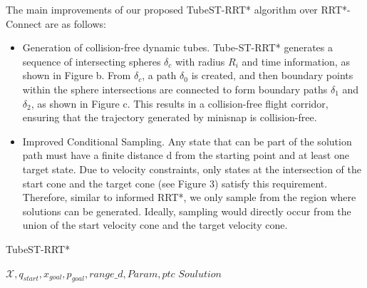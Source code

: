 \documentclass[conference]{IEEEtran}
\begin{document}
    The main improvements of our proposed TubeST-RRT* algorithm over RRT*-Connect are as follows:
    \begin{itemize}
        \item Generation of collision-free dynamic tubes. Tube-ST-RRT* generates a sequence of intersecting spheres $\delta_{c}$ with radius $R_i$ and time information, as shown in Figure b. From $\delta_{c}$, a path $\delta_{0}$ is created, and then boundary points within the sphere intersections are connected to form boundary paths $\delta_{1}$ and $\delta_{2}$, as shown in Figure c. This results in a collision-free flight corridor, ensuring that the trajectory generated by minisnap is collision-free.
        \item Improved Conditional Sampling. Any state that can be part of the solution path must have a finite distance d from the starting point and at least one target state. Due to velocity constraints, only states at the intersection of the start cone and the target cone (see Figure 3) satisfy this requirement. Therefore, similar to informed RRT*, we only sample from the region where solutions can be generated. Ideally, sampling would directly occur from the union of the start velocity cone and the target velocity cone. 
    \end{itemize}
    
    \begin{algorithm}
        \renewcommand{\algorithmicrequire}{\textbf{Input:}}
		\renewcommand{\algorithmicensure}{\textbf{Output:}}
		\caption{TubeST-RRT*}
		\label{algorrt}
        \begin{algorithmic}
            \REQUIRE $\mathcal{X},q_{start},x_{goal},p_{goal},range\_d,Param,ptc$
            \ENSURE $Soulution$
            \ENDIF{}
                \ENDIF{}
            \ENDIF{}
		\ENDWHILE{}
        \end{algorithmic}
    \end{algorithm}
\end{document}
